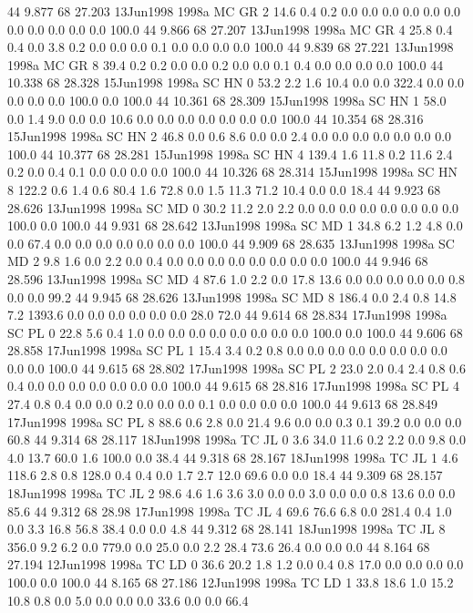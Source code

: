 44 9.877	68 27.203	13Jun1998	1998a	MC	GR	2	14.6	0.4	0.2	0.0	0.0	0.0	0.0	0.0	0.0	0.0	0.0	0.0	0.0	0.0	100.0
44 9.866	68 27.207	13Jun1998	1998a	MC	GR	4	25.8	0.4	0.4	0.0	3.8	0.2	0.0	0.0	0.0	0.1	0.0	0.0	0.0	0.0	100.0
44 9.839	68 27.221	13Jun1998	1998a	MC	GR	8	39.4	0.2	0.2	0.0	0.0	0.2	0.0	0.0	0.1	0.4	0.0	0.0	0.0	0.0	100.0
44 10.338	68 28.328	15Jun1998	1998a	SC	HN	0	53.2	2.2	1.6	10.4	0.0	0.0	322.4	0.0	0.0	0.0	0.0	0.0	100.0	0.0	100.0
44 10.361	68 28.309	15Jun1998	1998a	SC	HN	1	58.0	0.0	1.4	9.0	0.0	0.0	10.6	0.0	0.0	0.0	0.0	0.0	0.0	0.0	100.0
44 10.354	68 28.316	15Jun1998	1998a	SC	HN	2	46.8	0.0	0.6	8.6	0.0	0.0	2.4	0.0	0.0	0.0	0.0	0.0	0.0	0.0	100.0
44 10.377	68 28.281	15Jun1998	1998a	SC	HN	4	139.4	1.6	11.8	0.2	11.6	2.4	0.2	0.0	0.4	0.1	0.0	0.0	0.0	0.0	100.0
44 10.326	68 28.314	15Jun1998	1998a	SC	HN	8	122.2	0.6	1.4	0.6	80.4	1.6	72.8	0.0	1.5	11.3	71.2	10.4	0.0	0.0	18.4
44 9.923	68 28.626	13Jun1998	1998a	SC	MD	0	30.2	11.2	2.0	2.2	0.0	0.0	0.0	0.0	0.0	0.0	0.0	0.0	100.0	0.0	100.0
44 9.931	68 28.642	13Jun1998	1998a	SC	MD	1	34.8	6.2	1.2	4.8	0.0	0.0	67.4	0.0	0.0	0.0	0.0	0.0	0.0	0.0	100.0
44 9.909	68 28.635	13Jun1998	1998a	SC	MD	2	9.8	1.6	0.0	2.2	0.0	0.4	0.0	0.0	0.0	0.0	0.0	0.0	0.0	0.0	100.0
44 9.946	68 28.596	13Jun1998	1998a	SC	MD	4	87.6	1.0	2.2	0.0	17.8	13.6	0.0	0.0	0.0	0.0	0.0	0.8	0.0	0.0	99.2
44 9.945	68 28.626	13Jun1998	1998a	SC	MD	8	186.4	0.0	2.4	0.8	14.8	7.2	1393.6	0.0	0.0	0.0	0.0	0.0	0.0	28.0	72.0
44 9.614	68 28.834	17Jun1998	1998a	SC	PL	0	22.8	5.6	0.4	1.0	0.0	0.0	0.0	0.0	0.0	0.0	0.0	0.0	100.0	0.0	100.0
44 9.606	68 28.858	17Jun1998	1998a	SC	PL	1	15.4	3.4	0.2	0.8	0.0	0.0	0.0	0.0	0.0	0.0	0.0	0.0	0.0	0.0	100.0
44 9.615	68 28.802	17Jun1998	1998a	SC	PL	2	23.0	2.0	0.4	2.4	0.8	0.6	0.4	0.0	0.0	0.0	0.0	0.0	0.0	0.0	100.0
44 9.615	68 28.816	17Jun1998	1998a	SC	PL	4	27.4	0.8	0.4	0.0	0.0	0.2	0.0	0.0	0.0	0.1	0.0	0.0	0.0	0.0	100.0
44 9.613	68 28.849	17Jun1998	1998a	SC	PL	8	88.6	0.6	2.8	0.0	21.4	9.6	0.0	0.0	0.3	0.1	39.2	0.0	0.0	0.0	60.8
44 9.314	68 28.117	18Jun1998	1998a	TC	JL	0	3.6	34.0	11.6	0.2	2.2	0.0	9.8	0.0	4.0	13.7	60.0	1.6	100.0	0.0	38.4
44 9.318	68 28.167	18Jun1998	1998a	TC	JL	1	4.6	118.6	2.8	0.8	128.0	0.4	0.4	0.0	1.7	2.7	12.0	69.6	0.0	0.0	18.4
44 9.309	68 28.157	18Jun1998	1998a	TC	JL	2	98.6	4.6	1.6	3.6	3.0	0.0	0.0	3.0	0.0	0.0	0.8	13.6	0.0	0.0	85.6
44 9.312	68 28.98	17Jun1998	1998a	TC	JL	4	69.6	76.6	6.8	0.0	281.4	0.4	1.0	0.0	3.3	16.8	56.8	38.4	0.0	0.0	4.8
44 9.312	68 28.141	18Jun1998	1998a	TC	JL	8	356.0	9.2	6.2	0.0	779.0	0.0	25.0	0.0	2.2	28.4	73.6	26.4	0.0	0.0	0.0
44 8.164	68 27.194	12Jun1998	1998a	TC	LD	0	36.6	20.2	1.8	1.2	0.0	0.4	0.8	17.0	0.0	0.0	0.0	0.0	100.0	0.0	100.0
44 8.165	68 27.186	12Jun1998	1998a	TC	LD	1	33.8	18.6	1.0	15.2	10.8	0.8	0.0	5.0	0.0	0.0	0.0	33.6	0.0	0.0	66.4
